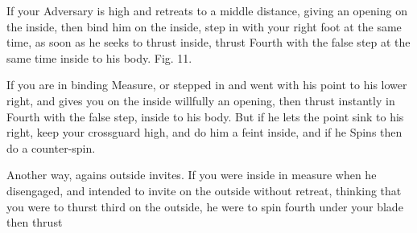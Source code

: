 
If your Adversary is high and retreats to a middle distance, giving an
opening on the inside, then bind him on the inside, step in with your
right foot at the same time, as soon as he seeks to thrust inside,
thrust Fourth with the false step at the same time inside to his
body. Fig. 11.

\exercise {}

If you are in binding Measure, or stepped in and went with his point to
his lower right, and gives you on the inside willfully an opening,
then thrust instantly in Fourth with the false step, inside to his
body. But if he lets the point sink to his right, keep your crossguard
high, and do him a feint inside, and if he Spins then do a
counter-spin.

\exercise {}


Another way, agains outside invites. If you were inside in measure
when he disengaged, and intended to invite on the outside without
retreat, thinking that you were to thurst third on the outside, he
were to spin fourth under your blade then thrust

